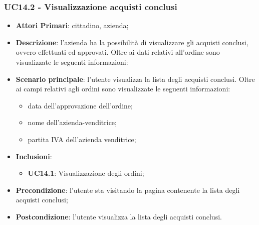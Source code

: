\subsubsection{UC14.2 - Visualizzazione acquisti conclusi}
\begin{itemize}
	\item \textbf{Attori Primari}: cittadino, azienda;
	\item \textbf{Descrizione}: l'azienda ha la possibilità di visualizzare gli acquisti conclusi, ovvero effettuati ed approvati. Oltre ai dati relativi all'ordine sono visualizzate le seguenti informazioni:
	\item \textbf{Scenario principale}: l'utente visualizza la lista degli acquisti conclusi. Oltre ai campi relativi agli ordini sono visualizzate le seguenti informazioni:
	\begin{itemize}
		\item data dell'approvazione dell'ordine;
		\item nome dell'azienda-venditrice;
		\item partita IVA dell'azienda venditrice;
	\end{itemize}
	
	\item \textbf{Inclusioni}:
	\begin{itemize}
		\item \textbf{UC14.1}: Visualizzazione degli ordini;
	\end{itemize}
	\item \textbf{Precondizione}: l'utente sta visitando la pagina contenente la lista degli acquisti conclusi;
	\item \textbf{Postcondizione}: l'utente visualizza la lista degli acquisti conclusi.
\end{itemize}

